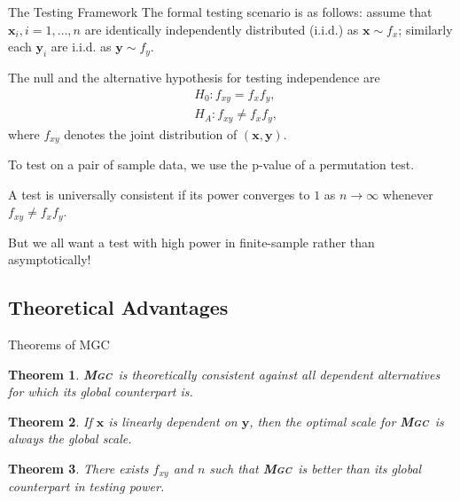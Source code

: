 \documentclass{beamer}
\newtheorem{thm}{Theorem}
\providecommand{\mb}[1]{\boldsymbol{#1}}
\providecommand{\sct}[1]{{\normalfont\textsc{#1}}}
\newcommand{\Mgc}{\textbf{\sct{Mgc}}}
\begin{document}
\begin{frame}{The Testing Framework}
The formal testing scenario is as follows: assume that $\mb{x}_i, i=1,\ldots,n$ are identically independently distributed (i.i.d.) as $\mb{x} \sim f_{x}$; similarly each $\mb{y}_{i}$ are i.i.d. as $\mb{y} \sim f_{y}$. 

\pause
\medskip
The null and the alternative hypothesis for testing independence are
\begin{align*}
& H_{0}: f_{xy}=f_{x}f_{y},\\
& H_{A}: f_{xy} \neq f_{x}f_{y},
\end{align*}
where $f_{xy}$ denotes the joint distribution of $(\mb{x},\mb{y})$. 

\pause
\medskip
To test on a pair of sample data, we use the p-value of a permutation test.%

\pause
\medskip
A test is universally consistent if its power converges to $1$ as $n \rightarrow \infty$ whenever $f_{xy} \neq f_x f_y$.

\pause
\medskip
But we all want a test with high power in finite-sample rather than asymptotically!
\end{frame}

\subsection{Theoretical Advantages}
\begin{frame}{Theorems of MGC}
\begin{thm}
\Mgc~is theoretically consistent against all dependent alternatives for which its global counterpart is. 
\end{thm}

\pause
\medskip
\begin{thm}
If $\mb{x}$ is linearly dependent on $\mb{y}$, then the optimal scale for \Mgc~is always the global scale.
\end{thm}

\pause
\medskip
\begin{thm}
There exists $f_{xy}$ and $n$ such that \Mgc~is better than its global counterpart in testing power.
\end{thm}
\end{frame}
\end{document}
